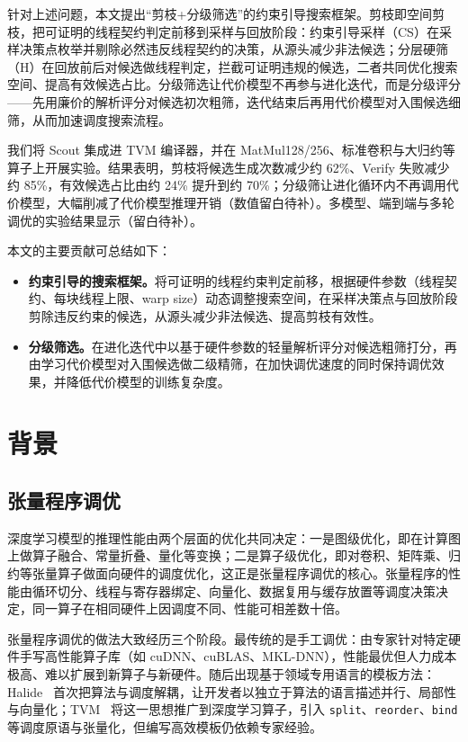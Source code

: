 \documentclass[11pt,twocolumn]{ctexart}
\begin{document}
针对上述问题，本文提出“剪枝+分级筛选”的约束引导搜索框架。剪枝即空间剪枝，把可证明的线程契约判定前移到采样与回放阶段：约束引导采样（CS）在采样决策点枚举并剔除必然违反线程契约的决策，从源头减少非法候选；分层硬筛（H）在回放前后对候选做线程判定，拦截可证明违规的候选，二者共同优化搜索空间、提高有效候选占比。分级筛选让代价模型不再参与进化迭代，而是分级评分——先用廉价的解析评分对候选初次粗筛，迭代结束后再用代价模型对入围候选细筛，从而加速调度搜索流程。

我们将 Scout 集成进 TVM 编译器，并在 MatMul128/256、标准卷积与大归约等算子上开展实验。结果表明，剪枝将候选生成次数减少约 62\%、Verify 失败减少约 85\%，有效候选占比由约 24\% 提升到约 70\%；分级筛让进化循环内不再调用代价模型，大幅削减了代价模型推理开销（数值留白待补）。多模型、端到端与多轮调优的实验结果显示（留白待补）。

本文的主要贡献可总结如下：
\begin{itemize}[leftmargin=1.6em]
\item \textbf{约束引导的搜索框架。}将可证明的线程约束判定前移，根据硬件参数（线程契约、每块线程上限、warp size）动态调整搜索空间，在采样决策点与回放阶段剪除违反约束的候选，从源头减少非法候选、提高剪枝有效性。
\item \textbf{分级筛选。}在进化迭代中以基于硬件参数的轻量解析评分对候选粗筛打分，再由学习代价模型对入围候选做二级精筛，在加快调优速度的同时保持调优效果，并降低代价模型的训练复杂度。
\end{itemize}

\section{背景}
\label{sec:background}

\subsection{张量程序调优}
深度学习模型的推理性能由两个层面的优化共同决定：一是图级优化，即在计算图上做算子融合、常量折叠、量化等变换；二是算子级优化，即对卷积、矩阵乘、归约等张量算子做面向硬件的调度优化，这正是张量程序调优的核心。张量程序的性能由循环切分、线程与寄存器绑定、向量化、数据复用与缓存放置等调度决策决定，同一算子在相同硬件上因调度不同、性能可相差数十倍。

张量程序调优的做法大致经历三个阶段。最传统的是手工调优：由专家针对特定硬件手写高性能算子库（如 cuDNN、cuBLAS、MKL-DNN），性能最优但人力成本极高、难以扩展到新算子与新硬件。随后出现基于领域专用语言的模板方法：Halide~\cite{halide} 首次把算法与调度解耦，让开发者以独立于算法的语言描述并行、局部性与向量化；TVM~\cite{tvm} 将这一思想推广到深度学习算子，引入 \texttt{split}、\texttt{reorder}、\texttt{bind} 等调度原语与张量化，但编写高效模板仍依赖专家经验。
\end{document}
